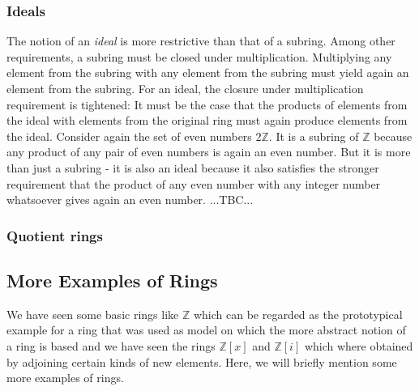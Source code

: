 
\subsubsection{Ideals}
The notion of an \emph{ideal} is more restrictive than that of a subring. Among other requirements, a subring must be closed under multiplication. Multiplying any element from the subring with any element from the subring must yield again an element from the subring. For an ideal, the closure under multiplication requirement is tightened: It must be the case that the products of elements from the ideal with elements from the original ring must again produce elements from the ideal. Consider again the set of even numbers $2 \mathbb{Z}$. It is a subring of $\mathbb{Z}$ because any product of any pair of even numbers is again an even number. But it is more than just a subring - it is also an ideal because it also satisfies the stronger requirement that the product of any even number with any integer number whatsoever gives again an even number.  ...TBC...



\subsubsection{Quotient rings}







\subsection{More Examples of Rings}
We have seen some basic rings like $\mathbb{Z}$ which can be regarded as the prototypical example for a ring that was used as model on which the more abstract notion of a ring is based and we have seen the rings $\mathbb{Z}[x]$ and $\mathbb{Z}[i]$ which where obtained by adjoining certain kinds of new elements. Here, we will briefly mention some more examples of rings.

